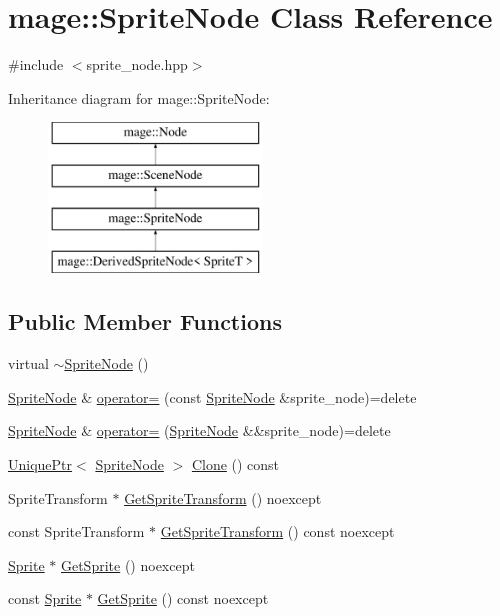 \hypertarget{classmage_1_1_sprite_node}{}\section{mage\+:\+:Sprite\+Node Class Reference}
\label{classmage_1_1_sprite_node}


{\ttfamily \#include $<$sprite\+\_\+node.\+hpp$>$}

Inheritance diagram for mage\+:\+:Sprite\+Node\+:\begin{figure}[H]
\begin{center}
\leavevmode
\includegraphics[height=4.000000cm]{classmage_1_1_sprite_node}
\end{center}
\end{figure}
\subsection*{Public Member Functions}
\begin{DoxyCompactItemize}
\item 
virtual \hyperlink{classmage_1_1_sprite_node_a04ada795f035b935af9992a6b7a75959}{$\sim$\+Sprite\+Node} ()
\item 
\hyperlink{classmage_1_1_sprite_node}{Sprite\+Node} \& \hyperlink{classmage_1_1_sprite_node_a009228c9f53671a4275534ceb7733bd0}{operator=} (const \hyperlink{classmage_1_1_sprite_node}{Sprite\+Node} \&sprite\+\_\+node)=delete
\item 
\hyperlink{classmage_1_1_sprite_node}{Sprite\+Node} \& \hyperlink{classmage_1_1_sprite_node_a908ba50d10d6573e913a8c2d785c7d69}{operator=} (\hyperlink{classmage_1_1_sprite_node}{Sprite\+Node} \&\&sprite\+\_\+node)=delete
\item 
\hyperlink{namespacemage_a3316d7143a973e37adf1110f2e80ca31}{Unique\+Ptr}$<$ \hyperlink{classmage_1_1_sprite_node}{Sprite\+Node} $>$ \hyperlink{classmage_1_1_sprite_node_a16481829a3796abd5afe5ce0c9ebf578}{Clone} () const
\item 
Sprite\+Transform $\ast$ \hyperlink{classmage_1_1_sprite_node_a99d90a2a337a45c0623022756c53f214}{Get\+Sprite\+Transform} () noexcept
\item 
const Sprite\+Transform $\ast$ \hyperlink{classmage_1_1_sprite_node_a021d8d7d51a05330bfa6d034482988a0}{Get\+Sprite\+Transform} () const noexcept
\item 
\hyperlink{classmage_1_1_sprite}{Sprite} $\ast$ \hyperlink{classmage_1_1_sprite_node_a84806dd38c94900f0fabf0163a706370}{Get\+Sprite} () noexcept
\item 
const \hyperlink{classmage_1_1_sprite}{Sprite} $\ast$ \hyperlink{classmage_1_1_sprite_node_a585276a679d83576464014eeb156cf10}{Get\+Sprite} () const noexcept
\end{DoxyCompactItemize}
